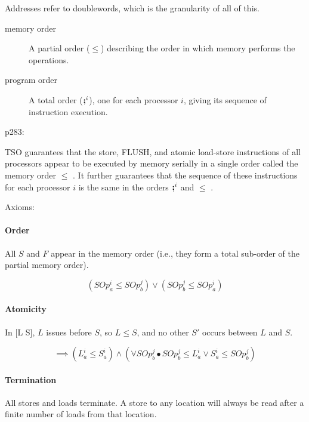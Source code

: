 Addresses refer to doublewords, which is the granularity of all of this.

\begin{description}
  \item [memory order]
    A partial order ($\leq$) describing the order
    in which memory performs the operations.
  \item[program order]
    A total order ($\textbf{;}^i$), one for each processor $i$,
    giving its sequence of instruction execution.
\end{description}

p283:

TSO guarantees that the store, FLUSH,
and atomic load-store instructions of all processors
appear to be executed by memory serially
in a single order called the memory order $\leq$ .
It further guarantees that
the sequence of these instructions for each processor $i$
is the same in the orders $\textbf{;}^i$ and $\leq$ .

Axioms:

\paragraph{Order}

All $S$ and $F$ appear in the memory order
(i.e., they form a total sub-order of the partial memory order).

\begin{equation*}
  (SOp_a^i \leq SOp_b^j) \lor (SOp_b^j \leq SOp_a^i)
\end{equation*}

\paragraph{Atomicity}

In [L \iseq S], $L$ issues before $S$, so $L \leq S$,
and no other $S'$ occurs between $L$ and $S$.

\begin{equation*}
  [L_a^i \iseq S_a^i]
  \implies
  (L_a^i \leq S_a^i)
  \land
  (\forall SOp_b^j
   \bullet
     SOp_b^j \leq L_a^i \lor S_a^i \leq SOp_b^j
   )
\end{equation*}


\paragraph{Termination}

All stores and loads terminate.
A store to any location
will always be read after a finite number of loads from that location.

